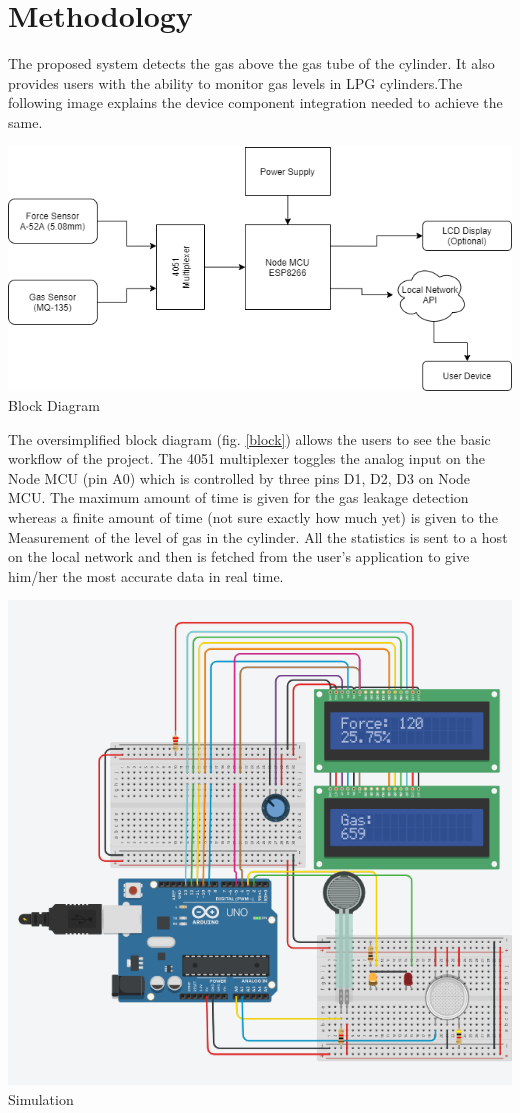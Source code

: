 \documentclass[conference]{IEEEtran}
\newenvironment{Figure}
  {\par\medskip\noindent\minipage{\linewidth}}
  {\endminipage\par\medskip}
\begin{document}
\section{Methodology}
The proposed system detects the gas above the gas tube of the cylinder.
It also provides users with the ability to monitor gas levels in
LPG cylinders.The following image explains the device component integration
needed to achieve the same.
\begin{Figure}
  \centering
  \includegraphics[width=\linewidth]{Images/BlockDiagram.png}
  \label{block}
  \figurename{Block Diagram}
\end{Figure}
The oversimplified block diagram (fig. \ref{block}) allows the users to
see the basic workflow of the project. The 4051
multiplexer toggles the analog input on the Node MCU
(pin A0) which is controlled by three pins D1, D2, D3
on Node MCU. The maximum amount of time is given for
the gas leakage detection whereas a finite amount of
time (not sure exactly how much yet) is given to the
Measurement of the level of gas in the cylinder. All
the statistics is sent to a host on the local network
and then is fetched from the user's application to give
him/her the most accurate data in real time.
\begin{Figure}
  \centering
  \includegraphics[width=\linewidth]{Images/Simulation.png}
  \label{sim}
  \figurename{Simulation}
\end{Figure}
\end{document}

